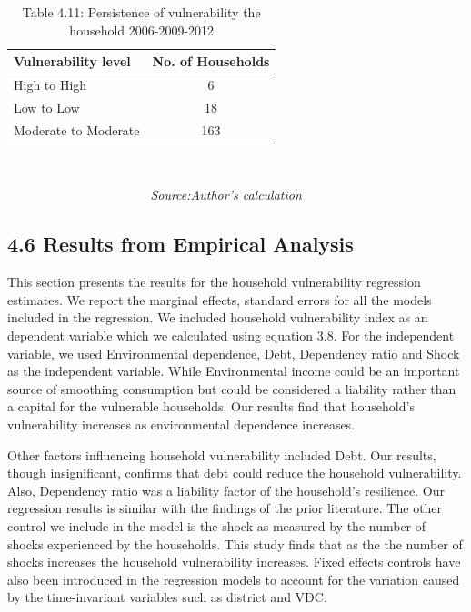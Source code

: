\begin{table}[H]
	\captionsetup{labelformat=empty}
	\captionsetup{labelformat=empty, skip=-7pt} %
	\caption{{Table 4.11}: Persistence of vulnerability the household 2006-2009-2012}
	\label{tab:Vulnerabilitypersistence}
	\begin{center}
		\begin{tabular}{lc} \hline
			\textbf{Vulnerability level} & \textbf{No. of Households} \\	\hline
			High to High & 6 \\
			Low to Low            & 18         \\
			Moderate to Moderate  & 163  \\ \hline \hline     
		\end{tabular} \\
	\end{center}\vspace{-8pt}
	\textit{\ \ \ \ \ \ \ \ \ \ \ \ \ \ \ \ \ \ \ \ \ \ Source:Author's calculation}
\end{table}

\clearpage
\subsection*{4.6 Results from Empirical Analysis}
\renewcommand{\thepage}{\arabic{page}}
This section presents the results for the household vulnerability regression estimates. We report the marginal effects, standard errors for all the models included in the regression. We included household vulnerability index as an dependent variable which we calculated using equation 3.8. For the independent variable, we used Environmental dependence, Debt, Dependency ratio and Shock as the independent variable. While Environmental income could be an important source of smoothing consumption but could be considered a liability rather than a capital for the vulnerable households.  Our results find that household's vulnerability increases as environmental dependence increases. 

Other factors influencing household vulnerability included Debt. Our results, though insignificant, confirms that debt could reduce the household vulnerability. Also, Dependency ratio was a liability factor of the household's resilience. Our regression results is similar with the findings of the prior literature. The other control we include in the model is the shock as measured by the number of shocks experienced by the households. This study finds that as the the number of shocks increases the household vulnerability increases. Fixed effects controls have also been introduced in the regression models to account for the variation caused by the time-invariant variables such as district and VDC.

